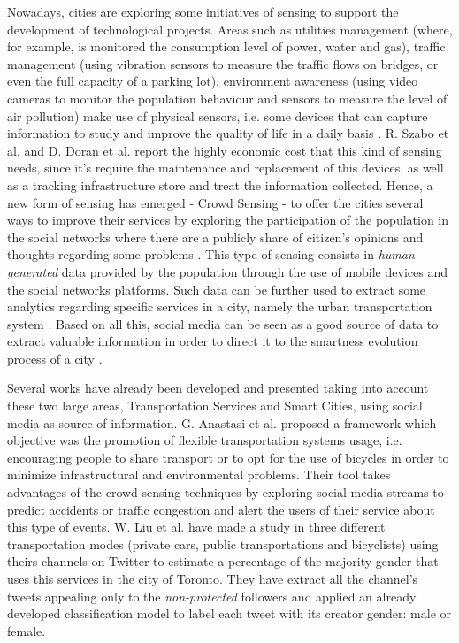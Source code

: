 Nowadays, cities are exploring some initiatives of sensing to support the development of technological projects. Areas such as utilities management (where, for example, is monitored the consumption level of power, water and gas), traffic management (using vibration sensors to measure the traffic flows on bridges, or even the full capacity of a parking lot), environment awareness (using video cameras to monitor the population behaviour and sensors to measure the level of air pollution) make use of physical sensors, i.e. some devices that can capture information to study and improve the quality of life in a daily basis \cite{kn:Doran2015}. R. Szabo et al. \cite{kn:Szabo2013} and D. Doran et al. \cite{kn:Doran2015} report the highly economic cost that this kind of sensing needs, since it's require the maintenance and replacement of this devices, as well as a tracking infrastructure store and treat the information collected. Hence, a new form of sensing has emerged - Crowd Sensing - to offer the cities several ways to improve their services by exploring the participation of the population in the social networks where there are a publicly share of citizen's opinions and thoughts regarding some problems \cite{kn:Roitman2012}. This type of sensing consists in \textit{human-generated} data provided by the population through the use of mobile devices and the social networks platforms. Such data can be further used to extract some analytics regarding specific services in a city, namely the urban transportation system \cite{kn:Roitman2012}. Based on all this, social media can be seen as a good source of data to extract valuable information in order to direct it to the smartness evolution process of a city \cite{kn:Szabo2013}. 

Several works have already been developed and presented taking into account these two large areas, Transportation Services and Smart Cities, using social media as source of information.
G. Anastasi et al. \cite{kn:Anastasi2013} proposed a framework which objective was the promotion of flexible transportation systems usage, i.e. encouraging people to share transport or to opt for the use of bicycles in order to minimize infrastructural and environmental problems. Their tool takes advantages of the crowd sensing techniques by exploring social media streams to predict accidents or traffic congestion and alert the users of their service about this type of events.
W. Liu et al. \cite{kn:Liu2012} have made a study in three different transportation modes (private cars, public transportations and bicyclists) using theirs channels on Twitter to estimate a percentage of the majority gender that uses this services in the city of Toronto. They have extract all the channel's tweets appealing only to the \textit{non-protected} followers and applied an already developed classification model to label each tweet with its creator gender: male or female.

